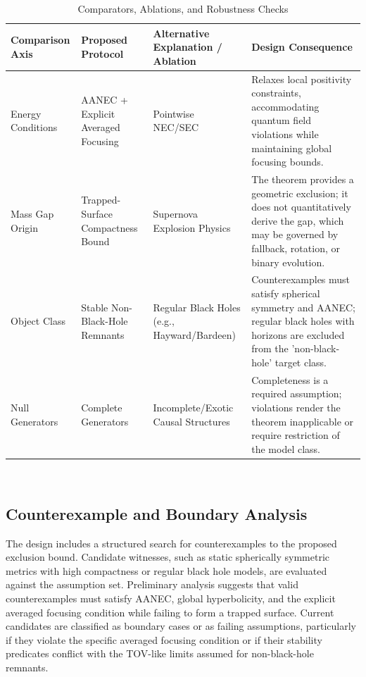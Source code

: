 \documentclass[conference]{IEEEtran}
\begin{document}
\begin{table}[htbp]
\centering
\footnotesize
\setlength{\tabcolsep}{3pt}
\renewcommand{\arraystretch}{1.12}
\caption{Comparators, Ablations, and Robustness Checks}
\label{tab:study-design-and-methods-s2}
\begin{tabular}{|p{}|p{}|p{}|p{}|}
\hline
Comparison Axis & Proposed Protocol & Alternative Explanation / Ablation & Design Consequence \\\hline
Energy Conditions & AANEC + Explicit Averaged Focusing & Pointwise NEC/SEC & Relaxes local positivity constraints, accommodating quantum field violations while maintaining global focusing bounds. \\\hline
Mass Gap Origin & Trapped-Surface Compactness Bound & Supernova Explosion Physics & The theorem provides a geometric exclusion; it does not quantitatively derive the gap, which may be governed by fallback, rotation, or binary evolution. \\\hline
Object Class & Stable Non-Black-Hole Remnants & Regular Black Holes (e.g., Hayward/Bardeen) & Counterexamples must satisfy spherical symmetry and AANEC; regular black holes with horizons are excluded from the 'non-black-hole' target class. \\\hline
Null Generators & Complete Generators & Incomplete/Exotic Causal Structures & Completeness is a required assumption; violations render the theorem inapplicable or require restriction of the model class. \\\hline
\end{tabular}
\end{table}~\cite{cite_789b47fb0241d9ae,cite_7a407c865faafd11,cite_c369df652181e8f7}

\subsection{Counterexample and Boundary Analysis}
The design includes a structured search for counterexamples to the proposed exclusion bound. Candidate witnesses, such as static spherically symmetric metrics with high compactness or regular black hole models, are evaluated against the assumption set. Preliminary analysis suggests that valid counterexamples must satisfy AANEC, global hyperbolicity, and the explicit averaged focusing condition while failing to form a trapped surface. Current candidates are classified as boundary cases or as failing assumptions, particularly if they violate the specific averaged focusing condition or if their stability predicates conflict with the TOV-like limits assumed for non-black-hole remnants.~\cite{cite_37ecbded9d629353}
\end{document}
